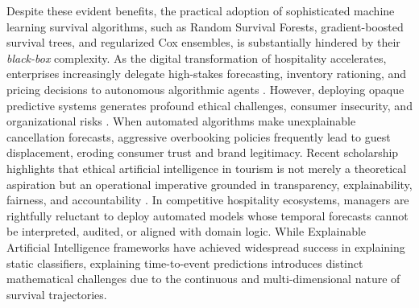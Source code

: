 \documentclass[pdflatex,iicol,sn-mathphys-ay]{sn-jnl}
\theoremstyle{thmstyleone}%
\theoremstyle{thmstyletwo}%
\theoremstyle{thmstylethree}%
\begin{document}
Despite these evident benefits, the practical adoption of sophisticated machine learning survival algorithms, such as Random Survival Forests, gradient-boosted survival trees, and regularized Cox ensembles, is substantially hindered by their \textit{black-box} complexity. As the digital transformation of hospitality accelerates, enterprises increasingly delegate high-stakes forecasting, inventory rationing, and pricing decisions to autonomous algorithmic agents \citep{dwivedi2025artificial}. However, deploying opaque predictive systems generates profound ethical challenges, consumer insecurity, and organizational risks \citep{lin2026developing}. When automated algorithms make unexplainable cancellation forecasts, aggressive overbooking policies frequently lead to guest displacement, eroding consumer trust and brand legitimacy. Recent scholarship highlights that ethical artificial intelligence in tourism is not merely a theoretical aspiration but an operational imperative grounded in transparency, explainability, fairness, and accountability \citep{law2025ethical, meske2022explainable, thiebes2021trustworthy}. In competitive hospitality ecosystems, managers are rightfully reluctant to deploy automated models whose temporal forecasts cannot be interpreted, audited, or aligned with domain logic. While Explainable Artificial Intelligence frameworks have achieved widespread success in explaining static classifiers, explaining time-to-event predictions introduces distinct mathematical challenges due to the continuous and multi-dimensional nature of survival trajectories.
\end{document}
